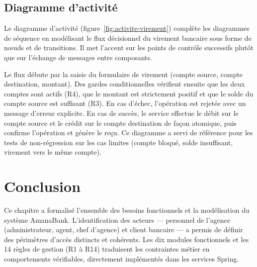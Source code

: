 \documentclass[11pt,a4paper,oneside]{report}
\newcommand{\nomapplication}{AmanaBank}
\begin{document}

\subsection{Diagramme d'activité}

Le diagramme d'activité (figure~\ref{fig:activite-virement}) complète les diagrammes de séquence en modélisant le flux décisionnel du virement bancaire sous forme de nœuds et de transitions. Il met l'accent sur les points de contrôle successifs plutôt que sur l'échange de messages entre composants.

Le flux débute par la saisie du formulaire de virement (compte source, compte destination, montant). Des gardes conditionnelles vérifient ensuite que les deux comptes sont actifs (R4), que le montant est strictement positif et que le solde du compte source est suffisant (R3). En cas d'échec, l'opération est rejetée avec un message d'erreur explicite. En cas de succès, le service effectue le débit sur le compte source et le crédit sur le compte destination de façon atomique, puis confirme l'opération et génère le reçu. Ce diagramme a servi de référence pour les tests de non-régression sur les cas limites (compte bloqué, solde insuffisant, virement vers le même compte).


\section{Conclusion}

Ce chapitre a formalisé l'ensemble des besoins fonctionnels et la modélisation du système \nomapplication. L'identification des acteurs --- personnel de l'agence (administrateur, agent, chef d'agence) et client bancaire --- a permis de définir des périmètres d'accès distincts et cohérents. Les dix modules fonctionnels et les 14 règles de gestion (R1 à R14) traduisent les contraintes métier en comportements vérifiables, directement implémentés dans les services Spring.
\end{document}
